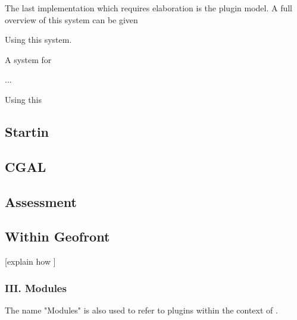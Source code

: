 


The last implementation which requires elaboration is the plugin model. 
A full overview of this system can be given 


Using this system. 



A system for 

...

Using this 


\subsection{ Startin }

\subsection{ CGAL }


\subsection{Assessment}




\subsection{Within Geofront}



[explain how ]


\subsubsection*{III. Modules} 


The name "Modules" is also used to refer to plugins within the context of \geofront{}.

